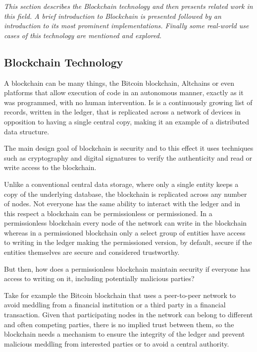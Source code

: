 \documentclass[notitlepage]{llncs}
\begin{document}
\textit{This section describes the Blockchain technology and then presents related work in this field. A brief introduction to Blockchain is presented followed by an introduction to its most prominent implementations. Finally some real-world use cases of this technology are mentioned and explored. }

\subsection{Blockchain Technology}

A blockchain can be many things, the Bitcoin blockchain, Altchains or even platforms that allow execution of code in an autonomous manner, exactly as it was programmed, with no human intervention. Is is a continuously growing list of records, written in the ledger, that is replicated across a network of devices in opposition to having a single central copy, making it an example of a distributed data structure.
\par  
The main design goal of blockchain is security and to this effect it uses techniques such as cryptography and digital signatures to verify the authenticity and read or write access to the blockchain.
\par
Unlike a conventional central data storage, where only a single entity keeps a copy of the underlying database, the blockchain is replicated across any number of nodes. Not everyone has the same ability to interact with the ledger and in this respect a blockchain can be permissionless or permissioned. In a permissionless blockchain every node of the network can write in the blockchain whereas in a permissioned blockchain only a select group of entities have access to writing in the ledger making the permissioned version, by default, secure if the entities themselves are secure and considered trustworthy.
\par
But then, how does a permissionless blockchain maintain security if everyone has access to writing on it, including potentially malicious parties?
\par
Take for example the Bitcoin blockchain that uses a peer-to-peer network to avoid meddling from a financial institution or a third party in a financial transaction. Given that participating nodes in the network can belong to different and often competing parties, there is no implied trust between them, so the blockchain needs a mechanism to ensure the integrity of the ledger and prevent malicious meddling from interested parties or to avoid a central authority.\cite{Barclay2017}
\end{document}
